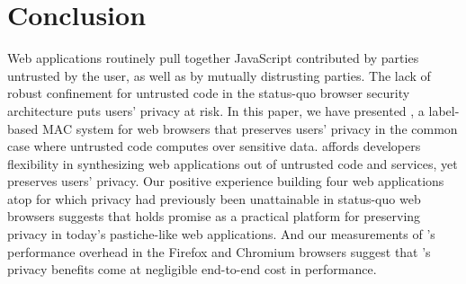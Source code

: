 \section{Conclusion}
\label{sec:conclusion}

Web applications routinely pull together JavaScript contributed by
parties untrusted by the user, as well as by mutually distrusting
parties.
The lack of robust confinement for untrusted code in the status-quo
browser security architecture puts users' privacy at risk.
In this paper, we have presented
\sys{}, a label-based MAC system for web browsers that preserves
users' privacy in the common case where untrusted code computes over
sensitive data. \sys{} affords developers flexibility in synthesizing
web applications out of untrusted code and services, yet preserves
users' privacy. Our positive experience building four web applications
atop \sys{} for which privacy had previously been unattainable in
status-quo web browsers suggests that \sys{} holds promise as a
practical platform for preserving privacy in today's pastiche-like web
applications. And our measurements of \sys{}'s performance overhead in
the Firefox and Chromium browsers suggest that \sys{}'s privacy
benefits come at negligible end-to-end cost in performance.

